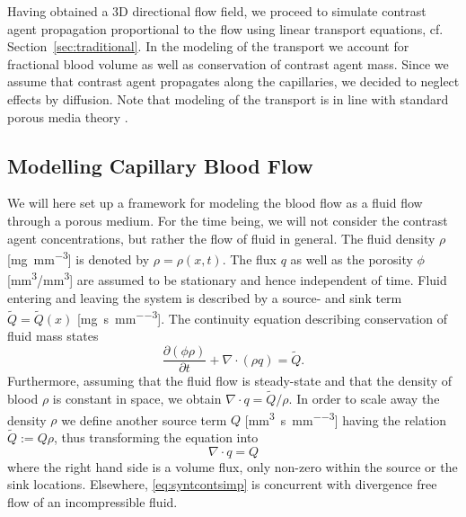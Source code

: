 \documentclass[journal,twocolumn]{IEEEtran}
\newcommand{\siQmm}{\milli\meter\cubed\per\second\per\milli\meter\cubed}
\newcommand{\sirho}{\milli\gram\per\milli\meter\cubed}
\newcommand{\siQtilde}{\milli\gram\per\second\per\milli\meter\cubed}
\newcommand{\simm}{\milli\meter\cubed}
\begin{document}
	Having obtained a 3D directional flow field, we proceed to simulate contrast agent propagation proportional to the flow using linear transport equations, cf. Section~\ref{sec:traditional}.
	In the modeling of the transport we account for fractional blood volume as well as conservation of contrast agent mass.
	Since we assume that contrast agent propagates along the capillaries, we decided to neglect effects by diffusion.
	Note that modeling of the transport is in line with standard porous media theory \cite{Aarnes2007}.
	
	
	

	
	\subsection{Modelling Capillary Blood Flow}\label{sec:flow}
	
	We will here set up a framework for modeling the blood flow as a fluid flow through a porous medium. For the time being, we will not consider the contrast agent concentrations, but rather the flow of fluid in general.
	The fluid density $\rho$ [\si{\sirho}] is denoted by $\rho = \rho(x,t)$.
	The flux $q$ as well as the porosity $\phi$ [\si{\simm}/\si{\simm}] are assumed to be stationary and hence independent of time.
	Fluid entering and leaving the system is described by a source- and sink term $\tilde{Q} = \tilde{Q}(x)$ [\si{\siQtilde}]. 
	The continuity equation describing conservation of fluid mass states
	\begin{equation}
		\frac{\partial (\phi \rho)}{\partial t} + \nabla \cdot (\rho q) = \tilde{Q}.
		\label{eq:syntcont}
	\end{equation} 
	Furthermore, assuming that the fluid flow is steady-state and that the density of blood $\rho$ is constant in space, we obtain $\nabla \cdot q = \tilde{Q}/\rho$.
	In order to scale away the density $\rho$ we define another source term $Q$ [\si{\siQmm}] having the relation $\tilde{Q} := Q\rho$, thus transforming the equation into 
	\begin{equation}
		\nabla \cdot q = Q
		\label{eq:syntcontsimp}
	\end{equation}
	where the right hand side is a volume flux, only non-zero within the source or the sink locations. 
	Elsewhere, \eqref{eq:syntcontsimp} is concurrent with divergence free flow of an incompressible fluid.
	
\end{document}
